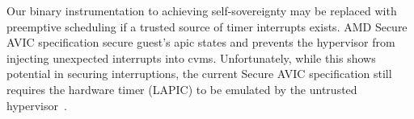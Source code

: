 % 



Our binary instrumentation to achieving self-sovereignty may be replaced with preemptive scheduling if a trusted source of timer interrupts exists.
AMD Secure AVIC specification \cite{secureavic} secure guest's \gls{apic} states and prevents the hypervisor from injecting unexpected interrupts into \glspl{cvm}.
Unfortunately, while this shows potential in securing interruptions, the current Secure AVIC specification still requires the hardware timer (LAPIC) to be emulated by the untrusted hypervisor~\cite{secureavic}.

\hdr{\textcolor{red}{Kill discussion}}








